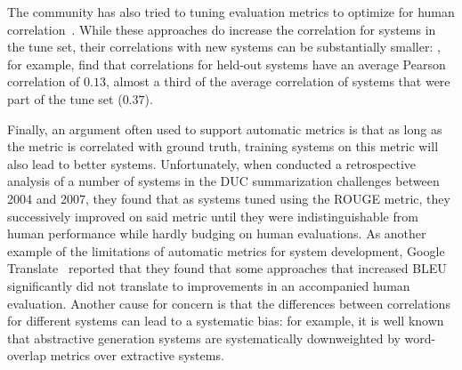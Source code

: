 The community has also tried to tuning evaluation metrics to optimize for human correlation~\citep{lavie2009meteor,denkowski2014meteor,lowe2017towards}.
While these approaches do increase the correlation for systems in the tune set, their correlations with new systems can be substantially smaller: \citet{lowe2017towards}, for example, find that correlations for held-out systems have an average Pearson correlation of $0.13$, almost a third of the average correlation of systems that were part of the tune set ($0.37$).

Finally, an argument often used to support automatic metrics is that as long as the metric is correlated with ground truth, training systems on this metric will also lead to better systems.
Unfortunately, when \citet{conroy2008mind} conducted a retrospective analysis of a number of systems in the DUC summarization challenges between 2004 and 2007, they found that as systems tuned using the ROUGE metric, they successively improved on said metric until they were indistinguishable from human performance while hardly budging on human evaluations.
As another example of the limitations of automatic metrics for system development, Google Translate~\citep{wu2016google} reported that they found that some approaches that increased BLEU significantly did not translate to improvements in an accompanied human evaluation.
Another cause for concern is that the differences between correlations for different systems can lead to a systematic bias: for example, it is well known that abstractive generation systems are systematically downweighted by word-overlap metrics over extractive systems. 


